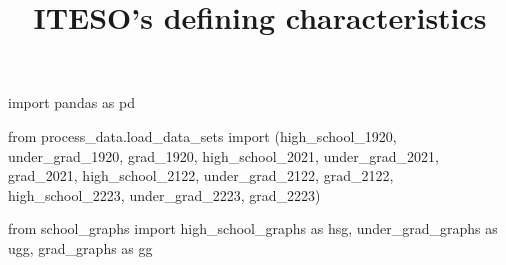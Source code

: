 \documentclass[
  letterpaper,
  DIV=11,
  numbers=noendperiod]{scrartcl}
\title{ITESO's defining characteristics}
\author{}
\date{}
\newenvironment{Shaded}{\begin{snugshade}}{\end{snugshade}}
\newcommand{\ImportTok}[1]{\textcolor[rgb]{0.00,0.46,0.62}{#1}}
\newcommand{\NormalTok}[1]{\textcolor[rgb]{0.00,0.23,0.31}{#1}}
\begin{document}
\maketitle


\begin{Shaded}
\begin{Highlighting}[]
\ImportTok{import}\NormalTok{ pandas }\ImportTok{as}\NormalTok{ pd}

\ImportTok{from}\NormalTok{ process\_data.load\_data\_sets }\ImportTok{import}\NormalTok{ (high\_school\_1920, under\_grad\_1920, grad\_1920,}
\NormalTok{                                            high\_school\_2021, under\_grad\_2021, grad\_2021,}
\NormalTok{                                            high\_school\_2122, under\_grad\_2122, grad\_2122,}
\NormalTok{                                            high\_school\_2223, under\_grad\_2223, grad\_2223)}

\ImportTok{from}\NormalTok{ school\_graphs }\ImportTok{import}\NormalTok{ high\_school\_graphs }\ImportTok{as}\NormalTok{ hsg, under\_grad\_graphs }\ImportTok{as}\NormalTok{ ugg, grad\_graphs }\ImportTok{as}\NormalTok{ gg}
\end{Highlighting}
\end{Shaded}
\end{document}
